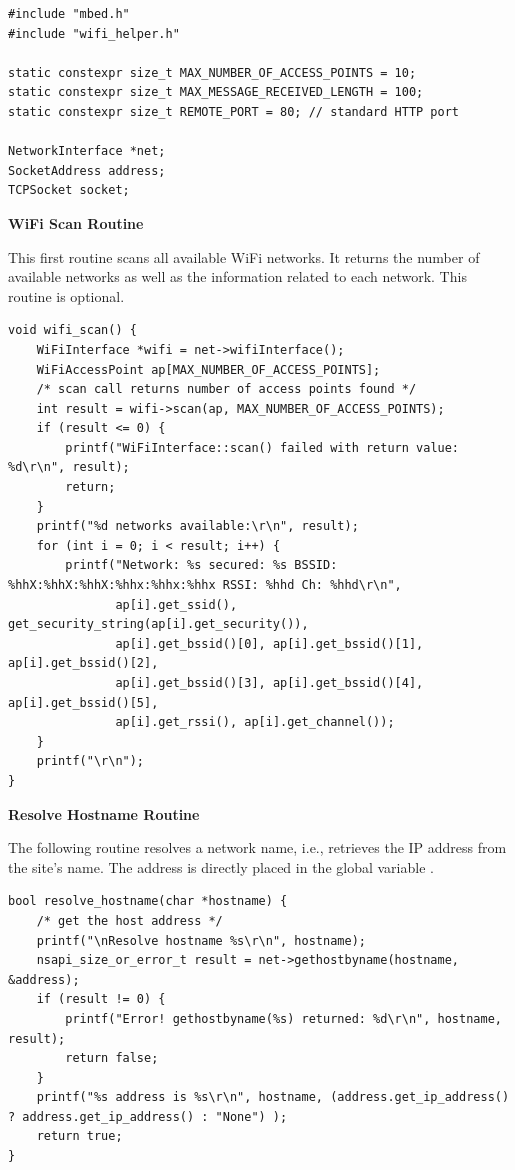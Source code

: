 \documentclass[10pt,a4paper,onecolumn]{article}
\let\textttOrig=\texttt
\def\texttt#1{\expandafter\textttOrig{\seqsplit{#1}}}
\begin{document}
\begin{lstlisting}[style=CStyle]
#include "mbed.h"
#include "wifi_helper.h"

static constexpr size_t MAX_NUMBER_OF_ACCESS_POINTS = 10;
static constexpr size_t MAX_MESSAGE_RECEIVED_LENGTH = 100;
static constexpr size_t REMOTE_PORT = 80; // standard HTTP port

NetworkInterface *net;
SocketAddress address;
TCPSocket socket;
\end{lstlisting}

\textbf{WiFi Scan Routine}

This first routine scans all available WiFi networks. It returns the number of available networks as well as the information related to each network. This routine is optional.

\begin{lstlisting}[style=CStyle]
void wifi_scan() {
    WiFiInterface *wifi = net->wifiInterface();
    WiFiAccessPoint ap[MAX_NUMBER_OF_ACCESS_POINTS];
    /* scan call returns number of access points found */
    int result = wifi->scan(ap, MAX_NUMBER_OF_ACCESS_POINTS);
    if (result <= 0) {
        printf("WiFiInterface::scan() failed with return value: %d\r\n", result);
        return;
    }
    printf("%d networks available:\r\n", result);
    for (int i = 0; i < result; i++) {
        printf("Network: %s secured: %s BSSID: %hhX:%hhX:%hhX:%hhx:%hhx:%hhx RSSI: %hhd Ch: %hhd\r\n",
               ap[i].get_ssid(), get_security_string(ap[i].get_security()),
               ap[i].get_bssid()[0], ap[i].get_bssid()[1], ap[i].get_bssid()[2],
               ap[i].get_bssid()[3], ap[i].get_bssid()[4], ap[i].get_bssid()[5],
               ap[i].get_rssi(), ap[i].get_channel());
    }
    printf("\r\n");
}
\end{lstlisting}

\textbf{Resolve Hostname Routine}

The following routine resolves a network name, i.e., retrieves the IP address from the site's name. The address is directly placed in the global variable \texttt{address}.

\begin{lstlisting}[style=CStyle]
bool resolve_hostname(char *hostname) {
    /* get the host address */
    printf("\nResolve hostname %s\r\n", hostname);
    nsapi_size_or_error_t result = net->gethostbyname(hostname, &address);
    if (result != 0) {
        printf("Error! gethostbyname(%s) returned: %d\r\n", hostname, result);
        return false;
    }
    printf("%s address is %s\r\n", hostname, (address.get_ip_address() ? address.get_ip_address() : "None") );
    return true;
}
\end{lstlisting}
\end{document}
